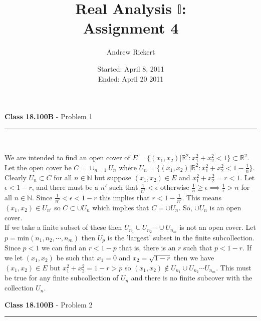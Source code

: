 \documentclass[11pt,reqno]{article}
\title{Real Analysis $\mathbb{I}$: \\ Assignment 4}
\author{Andrew Rickert}
\date{Started: April 8, 2011 \\ \hspace{1pt} Ended: April 20  2011}                                           %
\begin{document}
\maketitle


\begin{flushleft} 
\textbf{Class 18.100B} - Problem 1\\
\rule{500pt}{1pt}\\
\end{flushleft} 

We are intended to find an open cover of $E = \{(x_1,x_2) | \mathbb{R}^2 : x_1^2 + x_2^2 < 1\} \subset \mathbb{R}^2$. Let the open cover be $C = \cup_{n = 1} U_n$ where $U_n = \{ (x_1,x_2) | \mathbb{R}^2 : x_1^2 + x_2^2 < 1-\frac{1}{n} \}$. Clearly $U_n \subset C$ for all $n \in \mathbb{N}$ but suppose $(x_1,x_2) \in E$ and $ x_1^2 + x_2^2  = r < 1$. Let $\epsilon < 1 - r$, and there must be a $n'$ such that $\frac{1}{n'} < \epsilon$ otherwise $\frac{1}{n} \ge \epsilon \implies \frac{1}{\epsilon} > n$ for all $n \in \mathbb{N}$. Since $\frac{1}{n'} < \epsilon < 1 - r$ this implies that $r < 1 - \frac{1}{n'}$. This means $(x_1,x_2) \in U_{n'}$ so $C \subset \cup U_n$ which implies that $C = \cup U_n$. So, $\cup U_n$ is an open cover. \\
\indent If we take a finite subset of these then $U_{n_1} \cup U_{n_2} \cdots \cup U_{n_m}$ is not an open cover. Let $p = $min$(n_1,n_2,\cdots,n_m)$ then $U_p$ is the 'largest' subset in the finite subcollection. Since $p < 1$ we can find an $r < 1 - p$ that is, there is an $r$ such that $p < 1 - r$. If we let $(x_1,x_2)$ be such that $x_1 = 0$ and $x_2 = \sqrt{1-r}$ then we have $(x_1,x_2) \in E$ but $x_1^2 + x_2^2 = 1 - r > p$ so $(x_1,x_2) \notin U_{n_1} \cup U_{n_2} \cdots U_{n_m}$. This must be true for any finite subcollection of $U_n$ and there is no finite subcover with the collection $U_n$.

\vspace{15pt}
\begin{flushleft} 
\textbf{Class 18.100B} - Problem 2\\
\rule{500pt}{1pt}\\
\end{flushleft} 
\end{document}
